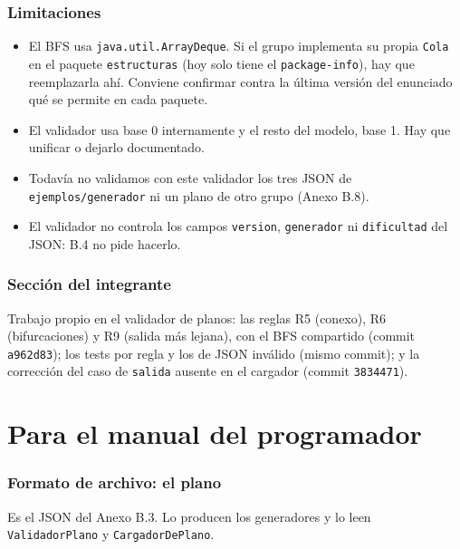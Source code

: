 \documentclass[11pt,a4paper]{article}
\begin{document}
\section{Limitaciones}

\begin{itemize}
  \item El BFS usa \texttt{java.util.ArrayDeque}. Si el grupo implementa su
        propia \texttt{Cola} en el paquete \texttt{estructuras} (hoy solo tiene
        el \texttt{package-info}), hay que reemplazarla ah\'i. Conviene
        confirmar contra la \'ultima versi\'on del enunciado qu\'e se permite en
        cada paquete.
  \item El validador usa base 0 internamente y el resto del modelo, base 1. Hay
        que unificar o dejarlo documentado.
  \item Todav\'ia no validamos con este validador los tres JSON de
        \texttt{ejemplos/generador} ni un plano de otro grupo (Anexo B.8).
  \item El validador no controla los campos \texttt{version}, \texttt{generador}
        ni \texttt{dificultad} del JSON: B.4 no pide hacerlo.
\end{itemize}

\section{Secci\'on del integrante}

Trabajo propio en el validador de planos: las reglas R5 (conexo), R6
(bifurcaciones) y R9 (salida m\'as lejana), con el BFS compartido (commit
\texttt{a962d83}); los tests por regla y los de JSON inv\'alido (mismo commit);
y la correcci\'on del caso de \texttt{salida} ausente en el cargador
(commit \texttt{3834471}).

\part{Para el manual del programador}

\section{Formato de archivo: el plano}

Es el JSON del Anexo B.3. Lo producen los generadores y lo leen
\texttt{ValidadorPlano} y \texttt{CargadorDePlano}.
\end{document}
